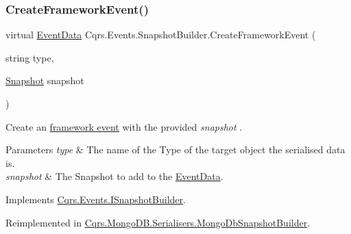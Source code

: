 \subsubsection{\texorpdfstring{Create\+Framework\+Event()}{CreateFrameworkEvent()}\hspace{0.1cm}{\footnotesize\ttfamily [1/2]}}
{\footnotesize\ttfamily virtual \hyperlink{classCqrs_1_1Events_1_1EventData}{Event\+Data} Cqrs.\+Events.\+Snapshot\+Builder.\+Create\+Framework\+Event (\begin{DoxyParamCaption}\item[{string}]{type,  }\item[{\hyperlink{classCqrs_1_1Snapshots_1_1Snapshot}{Snapshot}}]{snapshot }\end{DoxyParamCaption})\hspace{0.3cm}{\ttfamily [virtual]}}



Create an \hyperlink{}{framework event} with the provided {\itshape snapshot} . 


\begin{DoxyParams}{Parameters}
{\em type} & The name of the Type of the target object the serialised data is.\\
\hline
{\em snapshot} & The Snapshot to add to the \hyperlink{classCqrs_1_1Events_1_1EventData}{Event\+Data}.\\
\hline
\end{DoxyParams}


Implements \hyperlink{interfaceCqrs_1_1Events_1_1ISnapshotBuilder_a2f06f7a8f0995aabb90a0e8152271426_a2f06f7a8f0995aabb90a0e8152271426}{Cqrs.\+Events.\+I\+Snapshot\+Builder}.



Reimplemented in \hyperlink{classCqrs_1_1MongoDB_1_1Serialisers_1_1MongoDbSnapshotBuilder_ae05840d11ff5c3aa710b89bfbff1688b_ae05840d11ff5c3aa710b89bfbff1688b}{Cqrs.\+Mongo\+D\+B.\+Serialisers.\+Mongo\+Db\+Snapshot\+Builder}.

\mbox{\label{classCqrs_1_1Events_1_1SnapshotBuilder_ae6c7cd51ef132fb9a2cc951753b453c3_ae6c7cd51ef132fb9a2cc951753b453c3}} 

